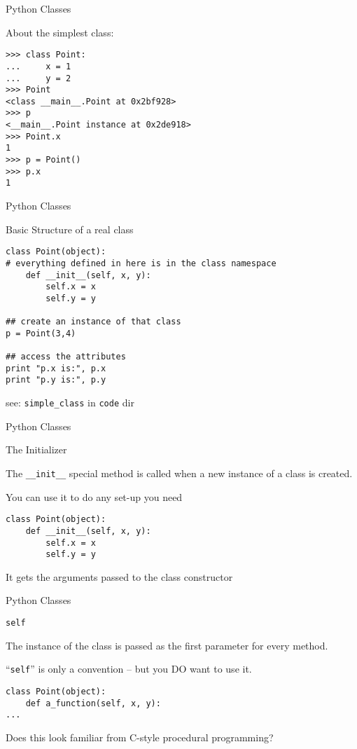 \documentclass{beamer}
\begin{document}
\begin{frame}[fragile]{Python Classes}

{\Large About the simplest class:}

\begin{verbatim}
>>> class Point:
...     x = 1
...     y = 2
>>> Point
<class __main__.Point at 0x2bf928>
>>> p
<__main__.Point instance at 0x2de918>
>>> Point.x
1
>>> p = Point()
>>> p.x
1
\end{verbatim}
\end{frame} 

\begin{frame}[fragile]{Python Classes}

{\Large Basic Structure of a real class}

\begin{verbatim}
class Point(object):
# everything defined in here is in the class namespace
    def __init__(self, x, y):
        self.x = x
        self.y = y

## create an instance of that class        
p = Point(3,4)

## access the attributes
print "p.x is:", p.x
print "p.y is:", p.y
\end{verbatim}

see: \verb|simple_class| in \verb|code| dir
\end{frame} 


\begin{frame}[fragile]{Python Classes}

{\LARGE The Initializer}

\vfill
{\Large The \verb|__init__| special method is called when a new instance of a class is created.}

\vfill
{\Large You can use it to do any set-up you need}

\vfill
\begin{verbatim}
class Point(object):
    def __init__(self, x, y):
        self.x = x
        self.y = y
\end{verbatim}
\vfill
{\Large It gets the arguments passed to the class constructor}
\end{frame} 

\begin{frame}[fragile]{Python Classes}

{\LARGE \verb|self|}

\vfill
{\Large The instance of the class is passed as the first parameter for every method.}

\vfill
{\Large ``\verb|self|'' is only a convention -- but you DO want to use it.}

\vfill
\begin{verbatim}
class Point(object):
    def a_function(self, x, y):
...
\end{verbatim}
\vfill
{\Large Does this look familiar from C-style procedural programming?}
\end{frame} 
\end{document}
